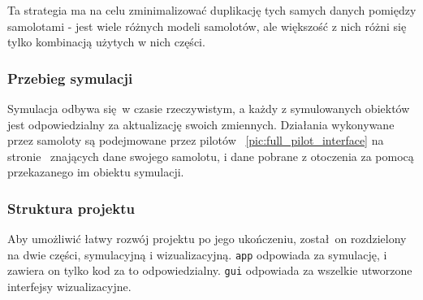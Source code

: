\documentclass{article}
\newcommand*{\fullref}[1]{\figurename~\ref{#1} na stronie~\pageref{#1}}
\begin{document}
Ta strategia ma na celu zminimalizować duplikację tych samych danych pomiędzy samolotami
- jest wiele różnych modeli samolotów, ale większość z nich różni się tylko kombinacją
użytych w nich części.

\subsubsection{Przebieg symulacji}

Symulacja odbywa się w czasie rzeczywistym, a każdy z symulowanych obiektów jest
odpowiedzialny za aktualizację swoich zmiennych.
Działania wykonywane przez samoloty są podejmowane przez pilotów \fullref{pic:full_pilot_interface}
znających dane swojego samolotu, i dane pobrane z otoczenia za pomocą przekazanego im obiektu
symulacji.

\subsubsection{Struktura projektu}

Aby umożliwić łatwy rozwój projektu po jego ukończeniu, został on rozdzielony na dwie części,
symulacyjną i wizualizacyjną. \lstinline{app} odpowiada za symulację, i zawiera on tylko kod 
za to odpowiedzialny. \lstinline{gui} odpowiada za wszelkie utworzone interfejsy wizualizacyjne.
\end{document}
